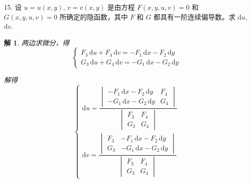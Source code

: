 \documentclass[a4paper,12pt]{article}
\newtheorem*{sol}{解}
\begin{document}
15. 设 $u = u(x,y)$, $v = v(x,y)$ 是由方程 $F(x,y,u,v) = 0$ 和 $G(x,y,u,v) = 0$ 所确定的隐函数，其中 $F$ 和 $G$ 都具有一阶连续偏导数。求 $\mathrm{d}u$, $\mathrm{d}v$.
\begin{sol}
    两边求微分，得
    $$\begin{cases}
            F_3\,\mathrm{d}u + F_4\,\mathrm{d}v = -F_1\,\mathrm{d}x - F_2\,\mathrm{d}y \\
            G_3\,\mathrm{d}u + G_4\,\mathrm{d}v = -G_1\,\mathrm{d}x - G_2\,\mathrm{d}y
        \end{cases}$$

    解得
    $$\begin{cases}
            \mathrm{d}u = \dfrac{\begin{vmatrix}
                                         -F_1\,\mathrm{d}x - F_2\,\mathrm{d}y & F_4 \\
                                         -G_1\,\mathrm{d}x - G_2\,\mathrm{d}y & G_4
                                     \end{vmatrix}}{\begin{vmatrix}
                                                        F_3 & F_4 \\
                                                        G_3 & G_4
                                                    \end{vmatrix}} \\[20pt]
            \mathrm{d}v = \dfrac{\begin{vmatrix}
                                         F_3 & -F_1\,\mathrm{d}x - F_2\,\mathrm{d}y \\
                                         G_3 & -G_1\,\mathrm{d}x - G_2\,\mathrm{d}y
                                     \end{vmatrix}}{\begin{vmatrix}
                                                        F_3 & F_4 \\
                                                        G_3 & G_4
                                                    \end{vmatrix}}
        \end{cases}$$
\end{sol}
\end{document}
